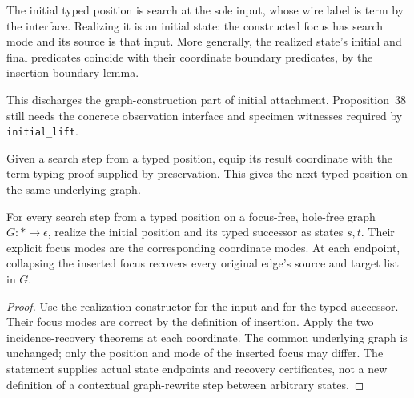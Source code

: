\begin{definition}\label{term:initial-attachment}
The initial typed position is search at the sole input, whose wire label is
term by the interface. Realizing it is an initial state: the constructed focus
has search mode and its source is that input. More generally, the realized
state's initial and final predicates coincide with their coordinate boundary
predicates, by the insertion boundary lemma.
\end{definition}
This discharges the graph-construction part of initial attachment. Proposition~38
still needs the concrete observation interface and specimen witnesses required
by \texttt{initial\_lift}.

\begin{definition}
Given a search step from a typed position, equip its result coordinate with
the term-typing proof supplied by preservation. This gives the next typed
position on the same underlying graph.
\end{definition}

\begin{theorem}
For every search step from a typed position on a focus-free, hole-free graph
$G:*\to\epsilon$, realize the initial position and its typed successor as
states $s,t$. Their explicit focus modes are the corresponding coordinate
modes. At each endpoint, collapsing the inserted focus recovers every
original edge's source and target list in $G$.
\end{theorem}
\begin{proof}
Use the realization constructor for the input and for the typed successor.
Their focus modes are correct by the definition of insertion. Apply the two
incidence-recovery theorems at each coordinate. The common underlying graph
is unchanged; only the position and mode of the inserted focus may differ.
The statement supplies actual state endpoints and recovery certificates, not
a new definition of a contextual graph-rewrite step between arbitrary states.
\end{proof}

